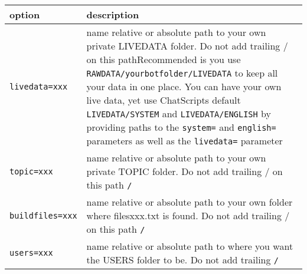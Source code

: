 \documentclass[]{article}
\begin{document}
\begin{longtable}[]{@{}ll@{}}
\toprule
\begin{minipage}[b]{0.16\columnwidth}\raggedright\strut
option\strut
\end{minipage} & \begin{minipage}[b]{0.78\columnwidth}\raggedright\strut
description\strut
\end{minipage}\tabularnewline
\midrule
\endhead
\begin{minipage}[t]{0.16\columnwidth}\raggedright\strut
\texttt{livedata=xxx}\strut
\end{minipage} & \begin{minipage}[t]{0.78\columnwidth}\raggedright\strut
name relative or absolute path to your own private LIVEDATA folder. Do
not add trailing / on this pathRecommended is you use
\texttt{RAWDATA/yourbotfolder/LIVEDATA} to keep all your data in one
place. You can have your own live data, yet use ChatScripts default
\texttt{LIVEDATA/SYSTEM} and \texttt{LIVEDATA/ENGLISH} by providing
paths to the \texttt{system=} and \texttt{english=} parameters as well
as the \texttt{livedata=} parameter\strut
\end{minipage}\tabularnewline
\begin{minipage}[t]{0.16\columnwidth}\raggedright\strut
\texttt{topic=xxx}\strut
\end{minipage} & \begin{minipage}[t]{0.78\columnwidth}\raggedright\strut
name relative or absolute path to your own private TOPIC folder. Do not
add trailing / on this path \texttt{/}\strut
\end{minipage}\tabularnewline
\begin{minipage}[t]{0.16\columnwidth}\raggedright\strut
\texttt{buildfiles=xxx}\strut
\end{minipage} & \begin{minipage}[t]{0.78\columnwidth}\raggedright\strut
name relative or absolute path to your own folder where filesxxx.txt is
found. Do not add trailing / on this path \texttt{/}\strut
\end{minipage}\tabularnewline
\begin{minipage}[t]{0.16\columnwidth}\raggedright\strut
\texttt{users=xxx}\strut
\end{minipage} & \begin{minipage}[t]{0.78\columnwidth}\raggedright\strut
name relative or absolute path to where you want the USERS folder to be.
Do not add trailing \texttt{/}\strut
\end{minipage}\tabularnewline

\end{longtable}
\end{document}
